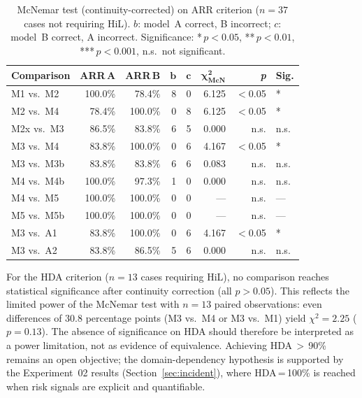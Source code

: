 \documentclass[preprint,12pt,authoryear]{elsarticle}
\begin{document}
\begin{table}[htbp]
\centering
\caption{McNemar test (continuity-corrected) on ARR criterion ($n=37$ cases
         not requiring HiL). $b$: model~A correct, B incorrect;
         $c$: model~B correct, A incorrect. Significance: *\,$p<0.05$,
         **\,$p<0.01$, ***\,$p<0.001$, n.s.\ not significant.}
\label{tab:mcnemar_arr}
\begin{tabular}{lrrrrrrl}
\toprule
\textbf{Comparison} & \textbf{ARR\,A} & \textbf{ARR\,B} &
  $\boldsymbol{b}$ & $\boldsymbol{c}$ &
  $\boldsymbol{\chi^2_{\text{McN}}}$ & \textbf{\textit{p}} & \textbf{Sig.} \\
\midrule
M1 vs.\ M2  & 100.0\% & 78.4\%  & 8 & 0 & 6.125 & $<$0.05 & * \\
M2 vs.\ M4  &  78.4\% & 100.0\% & 0 & 8 & 6.125 & $<$0.05 & * \\
M2x vs.\ M3 &  86.5\% &  83.8\% & 6 & 5 & 0.000 & n.s.    & n.s. \\
M3 vs.\ M4  &  83.8\% & 100.0\% & 0 & 6 & 4.167 & $<$0.05 & * \\
M3 vs.\ M3b &  83.8\% &  83.8\% & 6 & 6 & 0.083 & n.s.    & n.s. \\
M4 vs.\ M4b & 100.0\% &  97.3\% & 1 & 0 & 0.000 & n.s.    & n.s. \\
M4 vs.\ M5  & 100.0\% & 100.0\% & 0 & 0 & ---   & n.s.    & --- \\
M5 vs.\ M5b & 100.0\% & 100.0\% & 0 & 0 & ---   & n.s.    & --- \\
M3 vs.\ A1  &  83.8\% & 100.0\% & 0 & 6 & 4.167 & $<$0.05 & * \\
M3 vs.\ A2  &  83.8\% &  86.5\% & 5 & 6 & 0.000 & n.s.    & n.s. \\
\bottomrule
\end{tabular}
\end{table}

For the HDA criterion ($n=13$ cases requiring HiL), no comparison reaches
statistical significance after continuity correction (all $p>0.05$).
This reflects the limited power of the McNemar test with $n=13$ paired
observations: even differences of 30.8 percentage points (M3 vs.\ M4 or
M3 vs.\ M1) yield $\chi^2=2.25$ ($p=0.13$).
The absence of significance on HDA should therefore be interpreted as a power
limitation, not as evidence of equivalence.
Achieving HDA\,$>$\,90\% remains an open objective; the domain-dependency
hypothesis is supported by the Experiment~02 results
(Section~\ref{sec:incident}), where HDA\,=\,100\% is reached when risk
signals are explicit and quantifiable.
\end{document}
